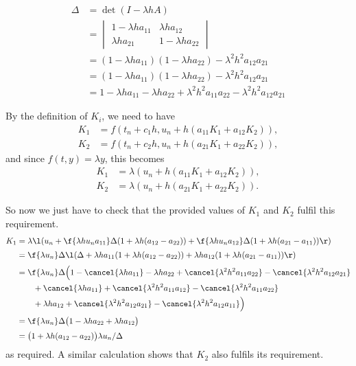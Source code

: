 \documentclass[a4paper]{article}
\begin{document}
\begin{align*}
\Delta &= \det(I - \lambda h A) \\[0.5ex]
&= \begin{vmatrix}
1 - \lambda h a_{11} & \lambda h a_{12} \\
\lambda h a_{21} & 1 - \lambda h a_{22}
\end{vmatrix} \\[0.5ex]
&= (1 - \lambda h a_{11}) (1 - \lambda h a_{22}) - \lambda^2 h^2 a_{12} a_{21} \\[0.5ex]
&= (1 - \lambda h a_{11}) (1 - \lambda h a_{22}) - \lambda^2 h^2 a_{12} a_{21} \\[0.5ex]
&= 1 - \lambda h a_{11} - \lambda h a_{22} + \lambda^2 h^2 a_{11} a_{22} - \lambda^2 h^2 a_{12} a_{21}
\end{align*}

By the definition of $K_i$, we need to have
\begin{align*}
K_1 &= f(t_n + c_1 h, u_n + h (a_{11} K_1 + a_{12} K_2)), \\[0.5ex]
K_2 &= f(t_n + c_2 h, u_n + h (a_{21} K_1 + a_{22} K_2)),
\end{align*}
and since $f(t, y) = \lambda y$, this becomes
\begin{align*}
K_1 &= \lambda (u_n + h (a_{11} K_1 + a_{12} K_2)), \\[0.5ex]
K_2 &= \lambda (u_n + h (a_{21} K_1 + a_{22} K_2)).
\end{align*}

So now we just have to check that the provided values of $K_1$ and $K_2$ fulfil this requirement.
\begin{align*}
K_1 &= \lambda \l( u_n + \f{\lambda h u_n a_{11}}\Delta (1 + \lambda h (a_{12} - a_{22})) + \f{\lambda h u_n a_{12}}\Delta (1 + \lambda h (a_{21} - a_{11})) \r) \\[0.5ex]
%
&= \f{\lambda u_n}\Delta \l( \Delta + \lambda h a_{11} (1 + \lambda h (a_{12} - a_{22})) + \lambda h a_{12} (1 + \lambda h (a_{21} - a_{11})) \r) \\[0.5ex]
%
&= \f{\lambda u_n}\Delta \Big(
    1 - \cancel{\lambda h a_{11}} - \lambda h a_{22} + \cancel{\lambda^2 h^2 a_{11} a_{22}} - \cancel{\lambda^2 h^2 a_{12} a_{21}} \\
    &\qquad + \cancel{\lambda h a_{11}} + \cancel{\lambda^2 h^2 a_{11} a_{12}} - \cancel{\lambda^2 h^2 a_{11} a_{22}} \\
    &\qquad + \lambda h a_{12} + \cancel{\lambda^2 h^2 a_{12} a_{21}} - \cancel{\lambda^2 h^2 a_{12} a_{11}}
\Big) \\[0.5ex]
%
&= \f{\lambda u_n}\Delta \big( 1 - \lambda h a_{22} + \lambda h a_{12} \big) \\[0.5ex]
&= \big( 1 + \lambda h (a_{12} - a_{22}) \big) \lambda u_n / \Delta
\end{align*}
as required. A similar calculation shows that $K_2$ also fulfils its requirement.
\end{document}
